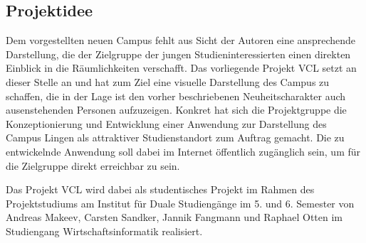 \subsection{Projektidee}
\label{sec:Projektidee}

Dem vorgestellten neuen Campus fehlt aus Sicht der Autoren eine ansprechende Darstellung,
die der Zielgruppe der jungen Studieninteressierten einen direkten Einblick in die
Räumlichkeiten verschafft. Das vorliegende Projekt \acs{VCL} setzt an dieser Stelle an und hat zum Ziel
eine visuelle Darstellung des Campus zu schaffen, die in der Lage ist den vorher beschriebenen Neuheitscharakter
auch ausenstehenden Personen aufzuzeigen. Konkret hat sich die Projektgruppe
die Konzeptionierung und Entwicklung einer Anwendung zur Darstellung
des Campus Lingen als attraktiver Studienstandort zum Auftrag gemacht.
Die zu entwickelnde Anwendung soll dabei im Internet öffentlich zugänglich sein, um
für die Zielgruppe direkt erreichbar zu sein.

Das Projekt VCL wird dabei als studentisches Projekt im Rahmen des Projektstudiums am Institut für
Duale Studiengänge im 5. und 6. Semester von Andreas Makeev, Carsten Sandker, Jannik Fangmann
und Raphael Otten im Studiengang Wirtschaftsinformatik realisiert.
